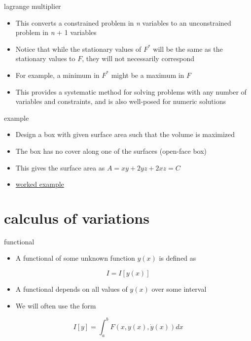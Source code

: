 \documentclass[12pt,handout]{beamer}
\providecommand{\tightlist}{%
  \setlength{\itemsep}{0pt}\setlength{\parskip}{0pt}}
\providecommand{\tightlist}{%
\setlength{\itemsep}{0pt}\setlength{\parskip}{0pt}}
\begin{document}
\begin{frame}{lagrange multiplier}
\protect\hypertarget{lagrange-multiplier-2}{}
\begin{itemize}
\tightlist
\item
  This converts a constrained problem in \emph{n} variables to an
  unconstrained problem in \emph{n} + 1 variables
\item
  Notice that while the stationary values of \(F^*\) will be the same as
  the stationary values to \(F\), they will not necessarily correspond
\item
  For example, a minimum in \(F^*\) might be a maximum in \(F\)
\item
  This provides a systematic method for solving problems with any number
  of variables and constraints, and is also well-posed for numeric
  solutions
\end{itemize}
\end{frame}

\begin{frame}{example}
\protect\hypertarget{example}{}
\begin{itemize}
\tightlist
\item
  Design a box with given surface area such that the volume is maximized
\item
  The box has no cover along one of the surfaces (open-face box)
\item
  This gives the surface area as \(A = xy + 2yz + 2xz = C\)
\item
  \href{http://nbviewer.jupyter.org/github/ndaman/multiscale/blob/master/examples/Lagrange\%20Multipliers.ipynb}{worked
  example}
\end{itemize}
\end{frame}

\hypertarget{calculus-of-variations}{%
\section{calculus of variations}\label{calculus-of-variations}}

\begin{frame}{functional}
\protect\hypertarget{functional}{}
\begin{itemize}
\tightlist
\item
  A functional of some unknown function \(y(x)\) is defined as
\end{itemize}

\[ I = I[y(x)]\]

\begin{itemize}
\tightlist
\item
  A functional depends on all values of \(y(x)\) over some interval
\item
  We will often use the form
\end{itemize}

\[I[y] = \int_a^b F(x,y(x),\dot{y}(x))dx\]
\end{frame}
\end{document}
